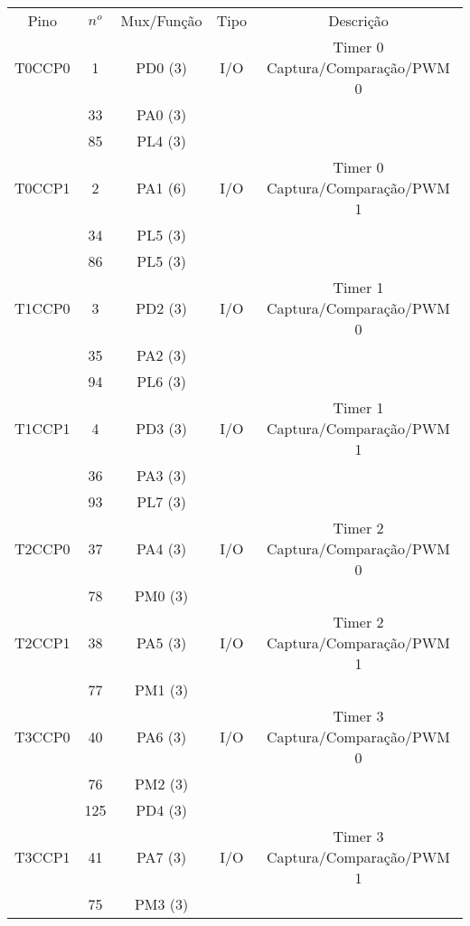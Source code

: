 \begin{center}
	\begin{longtable}{|c|c|c|c|c|}
		\rowcolor[HTML]{000000}
		{\color[HTML]{FFFFFF} Pino} & {\color[HTML]{FFFFFF} $n^{o}$} & {\color[HTML]{FFFFFF} Mux/Função} & {\color[HTML]{FFFFFF} Tipo} & {\color[HTML]{FFFFFF} Descrição}            \\
		T0CCP0    & 1   & PD0 (3) & I/O & Timer 0 Captura/Comparação/PWM 0\\
		& 33  & PA0 (3) &     &                                 \\
		& 85  & PL4 (3) &     &                                 \\ \hline
		T0CCP1    & 2   & PA1 (6) & I/O & Timer 0 Captura/Comparação/PWM 1\\
		& 34  & PL5 (3) &     &                                 \\
		& 86  & PL5 (3) &     &                                 \\ \hline
		T1CCP0    & 3   & PD2 (3) & I/O & Timer 1 Captura/Comparação/PWM 0\\
		& 35  & PA2 (3) &     &                                 \\
		& 94  & PL6 (3) &     &                                 \\ \hline
		T1CCP1    & 4   & PD3 (3) & I/O & Timer 1 Captura/Comparação/PWM 1\\
		& 36  & PA3 (3) &     &                                 \\
		& 93  & PL7 (3) &     &                                 \\ \hline
		T2CCP0    & 37  & PA4 (3) & I/O & Timer 2 Captura/Comparação/PWM 0\\
		& 78  & PM0 (3) &     &                                 \\ \hline
		T2CCP1    & 38  & PA5 (3) & I/O & Timer 2 Captura/Comparação/PWM 1\\
		& 77  & PM1 (3) &     &                                 \\ \hline
		T3CCP0    & 40  & PA6 (3) & I/O & Timer 3 Captura/Comparação/PWM 0\\
		& 76  & PM2 (3) &     &                                 \\ 
		& 125 & PD4 (3) &     &                                 \\ \hline
		T3CCP1    & 41  & PA7 (3) & I/O & Timer 3 Captura/Comparação/PWM 1\\
		& 75  & PM3 (3) &     &                                 \\ 

\end{longtable}
\end{center}
